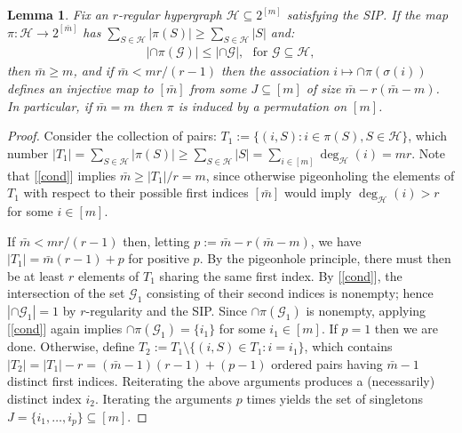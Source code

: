 \documentclass[9pt,twocolumn]{pnas-new}
\newtheorem{lemma}{Lemma}
\renewcommand{\eqref}[1]{\textnormal{[\ref{#1}]}}
\begin{document}
\begin{lemma}\label{NonEmptyLemma} 
Fix an $r$-regular hypergraph $\mathcal{H} \subseteq 2^{[m]}$ satisfying the SIP. If the map $\pi: \mathcal{H} \to 2^{[\bar m]}$ has $\sum_{S \in \mathcal{H}} |\pi(S)| \geq \sum_{S \in \mathcal{H}} |S|$ and:
\begin{align}\label{cond}
|\cap \pi(\mathcal{G})| \leq |\cap \mathcal{G} |,\ \ \   \text{for } \mathcal{G} \subseteq \mathcal{H},
\end{align}
%
then $\bar m \geq m$, and if $\bar m < mr / (r-1)$ then the association $i \mapsto \cap \pi(\sigma(i))$ defines an injective map to $[\bar m]$ from some $J \subseteq [m]$ of size $\bar m - r(\bar m - m)$. In particular, if $\bar m = m$ then $\pi$ is induced by a permutation on $[m]$.
\end{lemma}

\begin{proof}
Consider the collection of pairs: $T_1 := \{(i, S): i \in \pi(S), S \in \mathcal{H}\}$, which number $|T_1| = \sum_{S \in \mathcal{H}} |\pi(S)| \geq \sum_{S \in \mathcal{H}} |S| = \sum_{i \in [m]} \deg_\mathcal{H}(i) = mr$. Note that \eqref{cond} implies $\bar m \geq |T_1| / r = m$, since otherwise pigeonholing the elements of $T_1$ with respect to their possible first indices $[\bar m]$ would imply $\deg_\mathcal{H}(i) > r$ for some $i \in [m]$.

If $\bar m < mr / (r-1)$ then, letting $p := \bar m - r( \bar m - m)$, we have $|T_1| = \bar m (r - 1) + p$ for positive $p$. By the pigeonhole principle, there must then be at least $r$ elements of $T_1$ sharing the same first index. By \eqref{cond}, the intersection of the set $\mathcal{G}_1$ consisting of their second indices is nonempty; hence $|\cap \mathcal{G}_1| = 1$ by $r$-regularity and the SIP. Since $\cap \pi(\mathcal{G}_1)$ is nonempty, applying \eqref{cond} again implies $\cap \pi(\mathcal{G}_1) = \{i_1\}$ for some $i_1 \in [m]$. If $p=1$ then we are done. Otherwise, define $T_2 := T_1 \setminus \{(i,S) \in T_1: i = i_1\}$, which contains $|T_2| = |T_1| - r = (\bar m - 1)(r-1) + (p-1)$ ordered pairs having $\bar m - 1$ distinct first indices. Reiterating the above arguments produces a (necessarily) distinct index $i_2$. Iterating the arguments $p$ times yields the set of singletons \mbox{$J = \{i_1, \ldots, i_p\} \subseteq [m]$}.
\end{proof}
\end{document}
